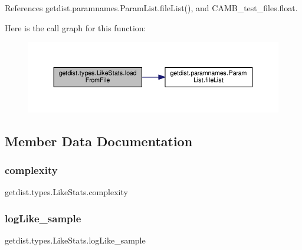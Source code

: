References getdist.\+paramnames.\+Param\+List.\+file\+List(), and C\+A\+M\+B\+\_\+test\+\_\+files.\+float.

Here is the call graph for this function\+:
\nopagebreak
\begin{figure}[H]
\begin{center}
\leavevmode
\includegraphics[width=350pt]{classgetdist_1_1types_1_1LikeStats_a7d2796576ba424f62edee6ae05ce37a2_cgraph}
\end{center}
\end{figure}


\subsection{Member Data Documentation}
\mbox{\label{classgetdist_1_1types_1_1LikeStats_a97f7463f7524cca0c910cd930f72849d}} 
\subsubsection{\texorpdfstring{complexity}{complexity}}
{\footnotesize\ttfamily getdist.\+types.\+Like\+Stats.\+complexity}

\mbox{\label{classgetdist_1_1types_1_1LikeStats_aa146837606828d529c748a30971c6a90}} 
\subsubsection{\texorpdfstring{log\+Like\+\_\+sample}{logLike\_sample}}
{\footnotesize\ttfamily getdist.\+types.\+Like\+Stats.\+log\+Like\+\_\+sample}



